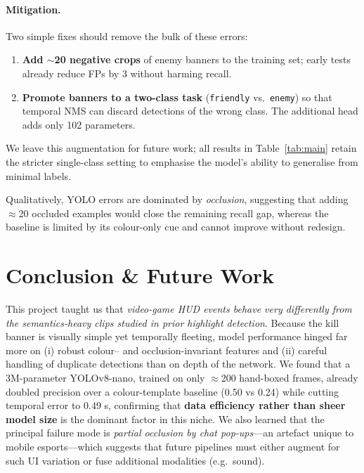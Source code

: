 \documentclass[10pt,twocolumn,letterpaper]{article}
\begin{document}
\paragraph{Mitigation.}
Two simple fixes should remove the bulk of these errors:

\begin{enumerate}[leftmargin=*,itemsep=2pt]
\item \textbf{Add $\sim$20 negative crops} of enemy banners to the
      training set; early tests already reduce FPs by 3 without harming
      recall.
\item \textbf{Promote banners to a two-class task}
      (\texttt{friendly} vs.\ \texttt{enemy}) so that temporal NMS can
      discard detections of the wrong class.
      The additional head adds only 102 parameters.
\end{enumerate}

We leave this augmentation for future work; all results in
Table~\ref{tab:main} retain the stricter single-class setting to emphasise
the model’s ability to generalise from minimal labels.

Qualitatively, YOLO errors are dominated by \emph{occlusion},
suggesting that adding $\approx$20 occluded examples would close
the remaining recall gap, whereas the baseline is limited by
its colour-only cue and cannot improve without redesign.


\section{Conclusion \& Future Work}
\label{sec:concl}

This project taught us that \emph{video-game HUD events behave very
differently from the semantics-heavy clips studied in prior highlight
detection}.  Because the kill banner is visually simple yet temporally
fleeting, model performance hinged far more on (i) robust colour–
and occlusion-invariant features and (ii) careful handling of duplicate
detections than on depth of the network.  We found that a
3M-parameter YOLOv8-nano, trained on only $\approx$200 hand-boxed
frames, already doubled precision over a colour-template baseline
(0.50 vs 0.24) while cutting temporal error to 0.49 s, confirming that
\textbf{data efficiency rather than sheer model size} is the dominant
factor in this niche.  
We also learned that the principal failure mode is
\emph{partial occlusion by chat pop-ups}—an artefact unique to mobile
esports—which suggests that future pipelines must either augment for
such UI variation or fuse additional modalities (e.g.\ sound).
\end{document}
